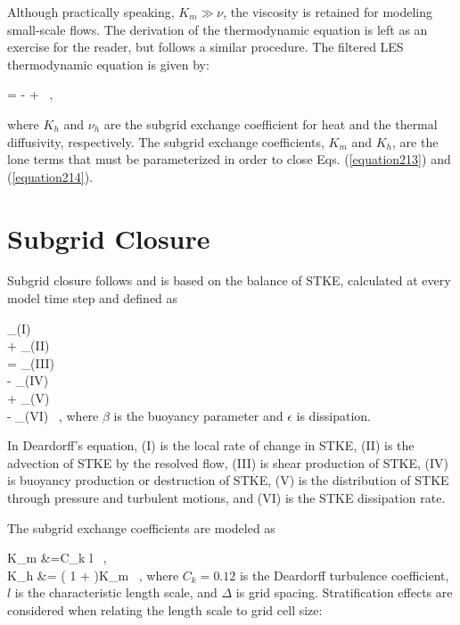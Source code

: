 \noindent Although practically speaking, $K_m \gg \nu$, the viscosity is retained for modeling small-scale flows. The derivation of the thermodynamic equation is left as an exercise for the reader, but follows a similar procedure. The filtered LES thermodynamic equation is given by:


\be
{} = -  +   \, ,
\label{equation214}
\ee


\noindent where $K_h$ and $\nu_h$ are the subgrid exchange coefficient for heat and the thermal diffusivity, respectively. The subgrid exchange coefficients, $K_m$ and $K_h$, are the lone terms that must be parameterized in order to close Eqs. (\autoref{equation213}) and (\autoref{equation214}).

\section{Subgrid Closure}
\label{sg-close-22}

Subgrid closure follows  \citet{Deardorff1980} and is based on the balance of STKE, calculated at every model time step and defined as

  
\be
{}_{(I)}\\
+ _{(II)}\\
= _{(III)} \\
- _{(IV)} \\
+ _{(V)}\\
- _{(VI)} \mbox{ ,}
\label{equation215}
\ee
\noindent
 where $\beta$ is the buoyancy parameter and $\epsilon$ is dissipation.

In Deardorff's equation, (I) is the local rate of change in STKE, (II) is the advection of STKE by the resolved flow, (III) is shear production of STKE, (IV) is buoyancy production or destruction of STKE, (V) is the distribution of STKE through pressure and turbulent motions, and (VI) is the STKE dissipation rate.

The subgrid exchange coefficients are modeled as 


\bse \label{equation216}
\bal
K_m &=C_k l  \mbox{ ,} \\
K_h &= \left( 1 +  \right)K_m \mbox{ ,}
\eal
\ese
\noindent
 where $C_k = 0.12$ is the Deardorff turbulence coefficient, $l$ is the characteristic length scale, and $\Delta$ is grid spacing. Stratification effects are considered when relating the length scale to grid cell size:


